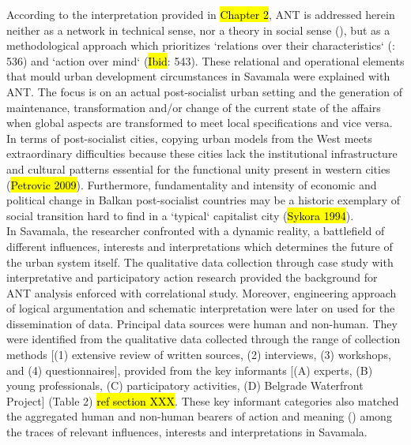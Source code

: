 \documentclass[11pt]{report}
\begin{document}
According to the interpretation provided in \hl{Chapter 2}, ANT is addressed herein neither as a network in technical sense, nor a theory in social sense (\cite{Latour 1996}), but as a methodological approach which prioritizes  `relations over their characteristics` (\cite{Cerulo 2009}: 536) and `action over mind` (\hl{Ibid}: 543). These relational and operational elements that mould urban development circumstances in Savamala were explained with ANT. The focus is on an actual post-socialist urban setting and the generation of maintenance, transformation and/or change of the current state of the affairs when global aspects are transformed to meet local specifications and vice versa. In terms of post-socialist cities, copying urban models from the West meets extraordinary difficulties because these cities lack the institutional infrastructure and cultural patterns essential for the functional unity present in western cities (\hl{Petrovic 2009}). Furthermore, fundamentality and intensity of economic and political change in Balkan post-socialist countries may be a historic exemplary of social transition hard to find in a `typical` capitalist city (\hl{Sykora 1994}).
\\
In Savamala, the researcher confronted with a dynamic reality, a battlefield of different influences, interests and interpretations which determines the future of the urban system itself. The qualitative data collection through case study with interpretative and participatory action research provided the background for ANT analysis enforced with correlational study. Moreover, engineering approach of logical argumentation and schematic interpretation were later on used for the dissemination of data. Principal data sources were human and non-human. They were identified from the qualitative data collected through the range of collection methods [(1) extensive review of written sources, (2) interviews, (3) workshops, and (4) questionnaires], provided from the key informants [(A) experts, (B) young professionals, (C) participatory activities, (D) Belgrade Waterfront Project] (Table 2) \hl{ref section XXX}. These key informant categories also matched the aggregated human and non-human bearers of action and meaning (\cite{Latour 2005}) among the traces of relevant influences, interests and interpretations in Savamala.
\\
\end{document}
